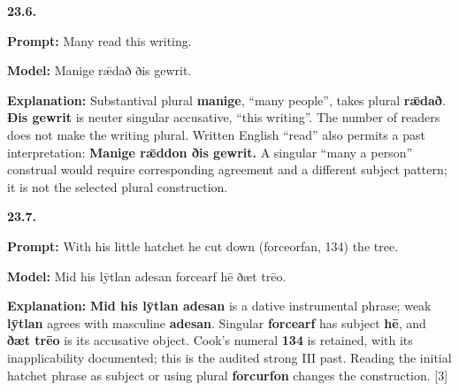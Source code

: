 \par\begin{minipage}{\linewidth}\raggedright
\textbf{23.6.}

\textbf{Prompt:} Many read this writing.

\textbf{Model:} Manige rǣdað ðis gewrit.

\textbf{Explanation:} Substantival plural \textbf{manige}, “many people”, takes plural \textbf{rǣdað}. \textbf{Ðis gewrit} is neuter singular accusative, “this writing”. The number of readers does not make the writing plural. Written English “read” also permits a past interpretation: \textbf{Manige rǣddon ðis gewrit.} A singular “many a person” construal would require corresponding agreement and a different subject pattern; it is not the selected plural construction.

\end{minipage}\par\addvspace{4pt}

\par\begin{minipage}{\linewidth}\raggedright
\textbf{23.7.}

\textbf{Prompt:} With his little hatchet he cut down (forceorfan, 134) the tree.

\textbf{Model:} Mid his lȳtlan adesan forcearf hē ðæt trēo.

\textbf{Explanation:} \textbf{Mid his lȳtlan adesan} is a dative instrumental phrase; weak \textbf{lȳtlan} agrees with masculine \textbf{adesan}. Singular \textbf{forcearf} has subject \textbf{hē}, and \textbf{ðæt trēo} is its accusative object. Cook’s numeral \textbf{134} is retained, with its inapplicability documented; this is the audited strong III past. Reading the initial hatchet phrase as subject or using plural \textbf{forcurfon} changes the construction. [3]

\end{minipage}\par\addvspace{4pt}

